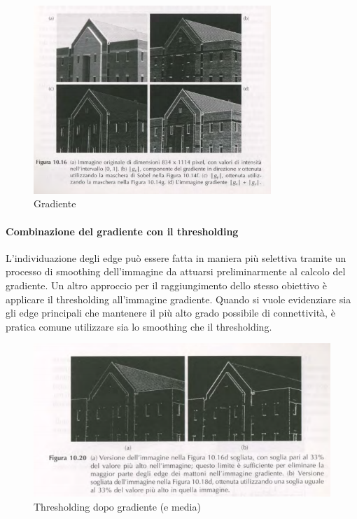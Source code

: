 \documentclass[12pt]{article}
\begin{document}
\begin{figure}[!htb]
    \centering
    \includegraphics[width=0.8\textwidth]{Images/grad2.png}
    \caption{Gradiente}
\end{figure}
\FloatBarrier
\paragraph{Combinazione del gradiente con il thresholding}
L'individuazione degli edge può essere fatta in maniera più selettiva tramite un processo di smoothing dell'immagine da attuarsi preliminarmente al calcolo del gradiente. Un altro approccio per il raggiungimento dello
stesso obiettivo è applicare il thresholding all'immagine gradiente. Quando si vuole evidenziare sia gli edge principali che mantenere il più alto grado possibile di connettività, è pratica comune utilizzare sia lo smoothing che il thresholding.
\begin{figure}[!htb]
    \centering
    \includegraphics[width=1\textwidth]{Images/edgeT.png}
    \caption{Thresholding dopo gradiente (e media)}
\end{figure}
\FloatBarrier
\end{document}
